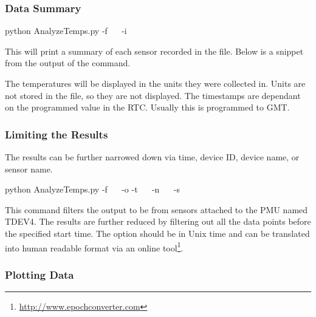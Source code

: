 \newpage
\subsubsection{Data Summary}

\begin{CommandLine}
python AnalyzeTemps.py -f ~~ -i
\end{CommandLine}

This will print a summary of each sensor recorded in the file.  Below is a
snippet from the output of the command. 


The temperatures will be displayed in the units they were collected in. Units
are not stored in the file, so they are not displayed. The timestamps are
dependant on the programmed value in the RTC. Usually this is programmed to GMT.
 
\subsubsection{Limiting the Results}

The results can be further narrowed down via time, device ID, device name, or sensor name. 

\begin{CommandLine}
python AnalyzeTemps.py -f ~~ -o -t ~~ -n ~~ -s ~~
\end{CommandLine}
 
This command filters the output to be from sensors attached to the PMU named
TDEV4. The results are further reduced by filtering out all the data points
before the specified start time. The  option should be
in Unix time and can be translated into human readable format via
an online tool\footnote{\url{http://www.epochconverter.com}}.

\newpage 
\subsubsection{Plotting Data}


